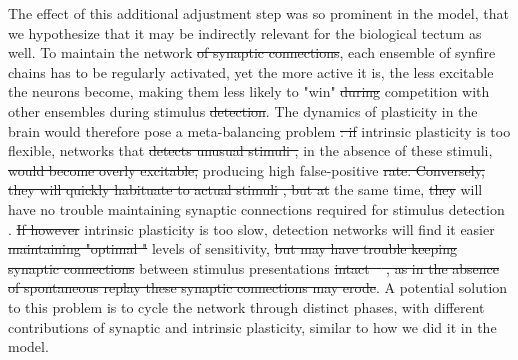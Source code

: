\documentclass{article}
\providecommand{\DIFaddtex}[1]{{\protect\color{blue}{#1}}} %
\providecommand{\DIFdeltex}[1]{{\protect\color{red}\sout{#1}}}                      %
\providecommand{\DIFaddbegin}{} %
\providecommand{\DIFaddend}{} %
\providecommand{\DIFdelbegin}{} %
\providecommand{\DIFdelend}{} %
\providecommand{\DIFadd}[1]{\texorpdfstring{\DIFaddtex{#1}}{#1}} %
\providecommand{\DIFdel}[1]{\texorpdfstring{\DIFdeltex{#1}}{}} %
\newcommand{\DIFscaledelfig}{0.5}
\newlength{\DIFdelgraphicswidth} %
\newlength{\DIFdelgraphicsheight} %
\newcommand{\DIFaddincludegraphics}[2][]{{\color{blue}\fbox{\DIFOincludegraphics[#1]{#2}}}} %
\newcommand{\DIFdelincludegraphics}[2][]{%
\sbox{\DIFdelgraphicsbox}{\DIFOincludegraphics[#1]{#2}}%
\settoboxwidth{\DIFdelgraphicswidth}{\DIFdelgraphicsbox} %
\settoboxtotalheight{\DIFdelgraphicsheight}{\DIFdelgraphicsbox} %
\scalebox{\DIFscaledelfig}{%
\parbox[b]{\DIFdelgraphicswidth}{\usebox{\DIFdelgraphicsbox}\\[-\baselineskip] \rule{\DIFdelgraphicswidth}{0em}}\llap{\resizebox{\DIFdelgraphicswidth}{\DIFdelgraphicsheight}{%
\setlength{\unitlength}{\DIFdelgraphicswidth}%
\begin{picture}(1,1)%
\thicklines\linethickness{2pt} %
{\color[rgb]{1,0,0}\put(0,0){\framebox(1,1){}}}%
{\color[rgb]{1,0,0}\put(0,0){\line( 1,1){1}}}%
{\color[rgb]{1,0,0}\put(0,1){\line(1,-1){1}}}%
\end{picture}%
}\hspace*{3pt}}} %
} %
\DeclareRobustCommand{\DIFaddbegin}{\DIFOaddbegin \let\includegraphics\DIFaddincludegraphics} %
\DeclareRobustCommand{\DIFaddend}{\DIFOaddend \let\includegraphics\DIFOincludegraphics} %
\DeclareRobustCommand{\DIFdelbegin}{\DIFOdelbegin \let\includegraphics\DIFdelincludegraphics} %
\DeclareRobustCommand{\DIFdelend}{\DIFOaddend \let\includegraphics\DIFOincludegraphics} %
\begin{document}
The effect of this additional adjustment step was so prominent in the model, that we hypothesize that it may be indirectly relevant for the biological tectum as well. To maintain the network \DIFdelbegin \DIFdel{of synaptic connections}\DIFdelend \DIFaddbegin \DIFadd{structure}\DIFaddend , each ensemble of synfire chains has to be regularly activated, yet the more active it is, the less excitable the neurons become, making them less likely to "win" \DIFdelbegin \DIFdel{during }\DIFdelend \DIFaddbegin \DIFadd{the }\DIFaddend competition with other ensembles during stimulus \DIFdelbegin \DIFdel{detection}\DIFdelend \DIFaddbegin \DIFadd{classification}\DIFaddend . The dynamics of plasticity in the brain would therefore pose a meta-balancing problem \citep{zenke2017temporal}\DIFdelbegin \DIFdel{: if }\DIFdelend \DIFaddbegin \DIFadd{. If }\DIFaddend intrinsic plasticity is too \DIFaddbegin \DIFadd{fast and }\DIFaddend flexible, networks that \DIFdelbegin \DIFdel{detects unusual stimuli , }\DIFdelend \DIFaddbegin \DIFadd{detect unusual stimuli would become overly excitable }\DIFaddend in the absence of these stimuli, \DIFdelbegin \DIFdel{would become overly excitable, }\DIFdelend producing high false-positive \DIFdelbegin \DIFdel{rate. Conversely, they will quickly habituate to actual stimuli , but at }\DIFdelend \DIFaddbegin \DIFadd{rates, and would habituate too fast when the stimuli are present. At }\DIFaddend the same time, \DIFdelbegin \DIFdel{they }\DIFdelend \DIFaddbegin \DIFadd{due to regular activation, these networks }\DIFaddend will have no trouble maintaining synaptic connections required for \DIFaddbegin \DIFadd{the }\DIFaddend stimulus detection \citep{litwin2014assemblies}. \DIFdelbegin \DIFdel{If however }\DIFdelend \DIFaddbegin \DIFadd{On the other hand, if }\DIFaddend intrinsic plasticity is too slow, detection networks will find it easier \DIFdelbegin \DIFdel{maintaining "optimal " }\DIFdelend \DIFaddbegin \DIFadd{to maintain optimal }\DIFaddend levels of sensitivity, \DIFdelbegin \DIFdel{but may have trouble keeping synaptic connections }\DIFdelend \DIFaddbegin \DIFadd{yet the synaptic connections that organize neurons into functional ensembles would erode and degrade due to disuse }\DIFaddend between stimulus presentations \DIFdelbegin \DIFdel{intact \mbox{%
\citep{triplett2018emergence}}\hspace{0pt}%
, as in the absence of spontaneous replay these synaptic connections may erode}\DIFdelend \DIFaddbegin \DIFadd{\mbox{%
\citep{triplett2018emergence}}\hspace{0pt}%
}\DIFaddend . A potential solution to this problem is to cycle the network through distinct phases, with different contributions of synaptic and intrinsic plasticity, \DIFaddbegin \DIFadd{reminiscent of sleep-wake phases, and }\DIFaddend similar to how we did it in the model.
\end{document}
